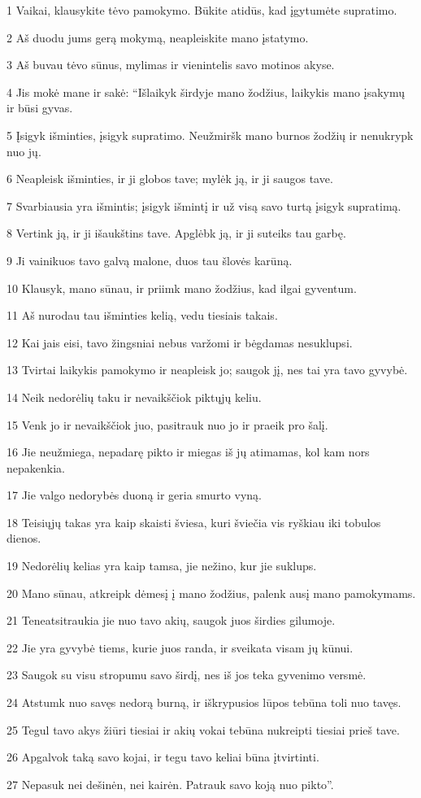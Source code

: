 \par 1 Vaikai, klausykite tėvo pamokymo. Būkite atidūs, kad įgytumėte supratimo. 
\par 2 Aš duodu jums gerą mokymą, neapleiskite mano įstatymo. 
\par 3 Aš buvau tėvo sūnus, mylimas ir vienintelis savo motinos akyse. 
\par 4 Jis mokė mane ir sakė: “Išlaikyk širdyje mano žodžius, laikykis mano įsakymų ir būsi gyvas. 
\par 5 Įsigyk išminties, įsigyk supratimo. Neužmiršk mano burnos žodžių ir nenukrypk nuo jų. 
\par 6 Neapleisk išminties, ir ji globos tave; mylėk ją, ir ji saugos tave. 
\par 7 Svarbiausia yra išmintis; įsigyk išmintį ir už visą savo turtą įsigyk supratimą. 
\par 8 Vertink ją, ir ji išaukštins tave. Apglėbk ją, ir ji suteiks tau garbę. 
\par 9 Ji vainikuos tavo galvą malone, duos tau šlovės karūną. 
\par 10 Klausyk, mano sūnau, ir priimk mano žodžius, kad ilgai gyventum. 
\par 11 Aš nurodau tau išminties kelią, vedu tiesiais takais. 
\par 12 Kai jais eisi, tavo žingsniai nebus varžomi ir bėgdamas nesuklupsi. 
\par 13 Tvirtai laikykis pamokymo ir neapleisk jo; saugok jį, nes tai yra tavo gyvybė. 
\par 14 Neik nedorėlių taku ir nevaikščiok piktųjų keliu. 
\par 15 Venk jo ir nevaikščiok juo, pasitrauk nuo jo ir praeik pro šalį. 
\par 16 Jie neužmiega, nepadarę pikto ir miegas iš jų atimamas, kol kam nors nepakenkia. 
\par 17 Jie valgo nedorybės duoną ir geria smurto vyną. 
\par 18 Teisiųjų takas yra kaip skaisti šviesa, kuri šviečia vis ryškiau iki tobulos dienos. 
\par 19 Nedorėlių kelias yra kaip tamsa, jie nežino, kur jie suklups. 
\par 20 Mano sūnau, atkreipk dėmesį į mano žodžius, palenk ausį mano pamokymams. 
\par 21 Teneatsitraukia jie nuo tavo akių, saugok juos širdies gilumoje. 
\par 22 Jie yra gyvybė tiems, kurie juos randa, ir sveikata visam jų kūnui. 
\par 23 Saugok su visu stropumu savo širdį, nes iš jos teka gyvenimo versmė. 
\par 24 Atstumk nuo savęs nedorą burną, ir iškrypusios lūpos tebūna toli nuo tavęs. 
\par 25 Tegul tavo akys žiūri tiesiai ir akių vokai tebūna nukreipti tiesiai prieš tave. 
\par 26 Apgalvok taką savo kojai, ir tegu tavo keliai būna įtvirtinti. 
\par 27 Nepasuk nei dešinėn, nei kairėn. Patrauk savo koją nuo pikto”.



